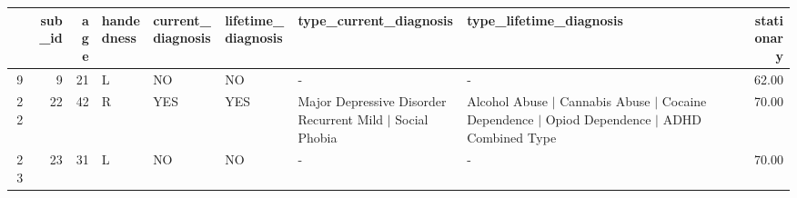 \begin{table}[ht]
\centering
\begin{tabular}{rrrlllllr}
  \hline
 & sub\_id & age & handedness & current\_diagnosis & lifetime\_diagnosis & type\_current\_diagnosis & type\_lifetime\_diagnosis & stationary \\ 
  \hline
9 &   9 &  21 & L & NO & NO & - & - & 62.00 \\ 
  22 &  22 &  42 & R & YES & YES & Major Depressive Disorder Recurrent Mild $|$ Social Phobia & Alcohol Abuse $|$ Cannabis Abuse $|$ Cocaine Dependence $|$ Opiod Dependence $|$ ADHD Combined Type & 70.00 \\ 
  23 &  23 &  31 & L & NO & NO & - & - & 70.00 \\ 
   \hline
\end{tabular}
\end{table}
